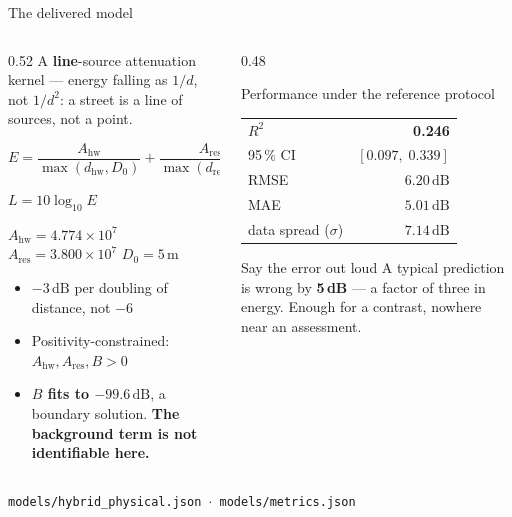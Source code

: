 \documentclass[aspectratio=169,10pt]{beamer}
\newcommand{\src}[1]{{\scriptsize\color{muted}\texttt{#1}}}
\newcommand{\aside}[1]{{\scriptsize\color{muted}#1}}
\newcommand{\wn}[1]{\textcolor{warn}{\textbf{#1}}}
\newcommand{\dB}{\,\mathrm{dB}}
\newcommand{\rr}{$R^2$}
\begin{document}
\begin{frame}{The delivered model}
  \begin{columns}[T]
    \begin{column}{0.52\textwidth}
      A \textbf{line}-source attenuation kernel --- energy falling as $1/d$,
      not $1/d^{2}$: a street is a line of sources, not a point.
      \begin{block}{}
        \centering
        $E = \dfrac{A_\mathrm{hw}}{\max(d_\mathrm{hw}, D_0)}
           + \dfrac{A_\mathrm{res}}{\max(d_\mathrm{res}, D_0)} + B$
        \vspace{.3em}

        $L = 10\log_{10} E$
      \end{block}
      \aside{$A_\mathrm{hw} = 4.774\times10^{7}$ \; $A_\mathrm{res} = 3.800\times10^{7}$ \; $D_0 = 5$\,m}
      \begin{itemize}
        \item $-3\dB$ per doubling of distance, not $-6$
        \item Positivity-constrained: $A_\mathrm{hw}, A_\mathrm{res}, B > 0$
        \item \wn{$B$ fits to $-99.6\dB$}, a boundary solution.
              \textbf{The background term is not identifiable here.}
      \end{itemize}
    \end{column}
    \begin{column}{0.48\textwidth}
      \begin{block}{Performance under the reference protocol}
        \begin{tabular}{@{}lr@{}}
          \rr{}       & \textbf{0.246} \\
          95\,\% CI   & $[0.097,\; 0.339]$ \\
          RMSE        & $6.20\dB$ \\
          MAE         & $5.01\dB$ \\
          \midrule
          data spread ($\sigma$) & $7.14\dB$ \\
          \bottomrule
        \end{tabular}
      \end{block}
      \begin{alertblock}{Say the error out loud}
        A typical prediction is wrong by \textbf{5\,dB} --- a factor of three
        in energy. Enough for a contrast, nowhere near an assessment.
      \end{alertblock}
    \end{column}
  \end{columns}
  \src{models/hybrid\_physical.json \; $\cdot$ \; models/metrics.json}
\end{frame}
\end{document}
